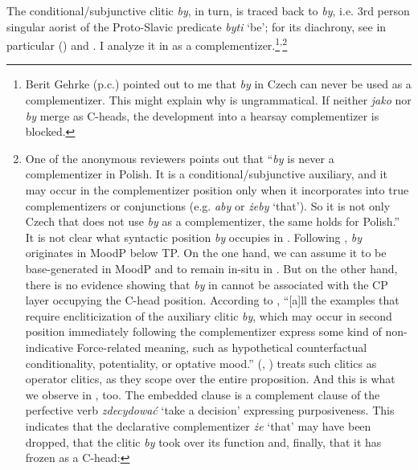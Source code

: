 \documentclass[output=paper]{langsci/langscibook}
\begin{document}
The conditional\slash subjunctive clitic \emph{by}, in turn, is traced back to \*\emph{by}, i.e. 3rd person singular aorist of the Proto-Slavic predicate \*\emph{byti} `be'; for its diachrony, see in particular \citeauthor{Migdalski2016} (\citeyear{Migdalski2006, Migdalski2009, Migdalski2016}) and \textcite{Willis2000}. I analyze it in  as a complementizer.\footnote{Berit Gehrke (p.c.) pointed out to me that \emph{by} in Czech can never be used as a complementizer. This might explain why  is ungrammatical. If neither \emph{jako} nor \emph{by} merge as C-heads, the development into a hearsay complementizer is blocked.
}\textsuperscript{,}\footnote{One of the anonymous reviewers points out that ``\emph{by} is never a complementizer in Polish. It is a conditional\slash subjunctive auxiliary, and it may occur in the complementizer position only when it incorporates into true complementizers or conjunctions (e.g. \emph{aby} or \emph{żeby} `that'). So it is not only Czech that does not use \emph{by} as a complementizer, the same holds for Polish.'' It is not clear what syntactic position \emph{by} occupies in . Following \textcite{Migdalski2006}, \emph{by} originates in MoodP below TP. On the one hand, we can assume it to be base-generated in MoodP and to remain in-situ in . But on the other hand, there is no evidence showing that \emph{by} in   cannot be associated with the CP layer occupying the C-head position. According to  \textcite[171]{Migdalski2016}, ``[a]ll the examples that require encliticization of the auxiliary clitic \emph{by}, which may occur in second position immediately following the complementizer express some kind of non-indicative Force-related meaning, such as hypothetical counterfactual conditionality, potentiality, or optative mood.'' \citeauthor{Tomic2001} (\citeyear{Tomic2000}, \citeyear{Tomic2001}) treats such clitics as operator clitics, as they scope over the entire proposition. And this is what we observe in , too. The embedded clause is a complement clause of the perfective verb \emph{zdecydować} `take a decision' expressing purposiveness. This indicates that the declarative complementizer \emph{że} `that' may have been dropped, that the clitic \emph{by} took over its function and, finally, that it has frozen as a C-head:

}
\end{document}
